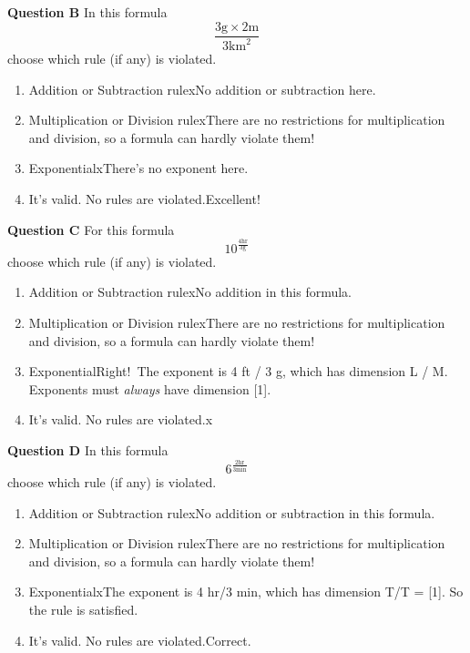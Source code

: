 \documentclass[
  letterpaper,
  DIV=11,
  numbers=noendperiod,
  oneside]{article}
\providecommand{\tightlist}{%
  \setlength{\itemsep}{0pt}\setlength{\parskip}{0pt}}\usepackage{longtable,booktabs,array}
\begin{document}
\begin{multicols}{2}
\textbf{Question B} In this formula
\[\frac{3 \text{g} \times 2 \text{m}}{3 \text{km}^2}\] choose which rule
(if any) is violated.

\begin{enumerate}
\def\labelenumi{\roman{enumi}.}
\tightlist
\item
  {Addition or Subtraction rule{xNo addition or subtraction here.}}\\
\item
  {Multiplication or Division rule{xThere are no restrictions for
  multiplication and division, so a formula can hardly violate them!}}\\
\item
  {Exponential{xThere's no exponent here.}}\\
\item
  {It's valid. No rules are violated.{Excellent!~}}
\end{enumerate}

\textbf{Question C} For this formula
\[10^{\frac{4 \text{hr}}{3 \text{g}}}\] choose which rule (if any) is
violated.

\begin{enumerate}
\def\labelenumi{\roman{enumi}.}
\tightlist
\item
  {Addition or Subtraction rule{xNo addition in this formula.}}\\
\item
  {Multiplication or Division rule{xThere are no restrictions for
  multiplication and division, so a formula can hardly violate them!}}\\
\item
  {Exponential{Right!~The exponent is 4 ft / 3 g, which has dimension L
  / M. Exponents must \emph{always} have dimension {[}1{]}.}}\\
\item
  {It's valid. No rules are violated.{x}}
\end{enumerate}

\textbf{Question D} In this formula
\[6^{\frac{2 \text{hr}}{3 \text{min}}}\]choose which rule (if any) is
violated.

\begin{enumerate}
\def\labelenumi{\roman{enumi}.}
\tightlist
\item
  {Addition or Subtraction rule{xNo addition or subtraction in this
  formula.}}\\
\item
  {Multiplication or Division rule{xThere are no restrictions for
  multiplication and division, so a formula can hardly violate them!}}\\
\item
  {Exponential{xThe exponent is 4 hr/3 min, which has dimension T/T =
  {[}1{]}. So the rule is satisfied.}}\\
\item
  {It's valid. No rules are violated.{Correct.~}}
\end{enumerate}


\end{multicols}
\end{document}
